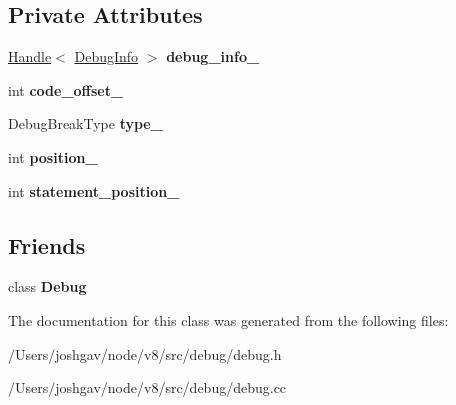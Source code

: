 \subsection*{Private Attributes}
\begin{DoxyCompactItemize}
\item 
\hyperlink{classv8_1_1internal_1_1_handle}{Handle}$<$ \hyperlink{classv8_1_1internal_1_1_debug_info}{Debug\+Info} $>$ {\bfseries debug\+\_\+info\+\_\+}\hypertarget{classv8_1_1internal_1_1_break_location_aee8d3109c7211877acd933a957ca2c6e}{}\label{classv8_1_1internal_1_1_break_location_aee8d3109c7211877acd933a957ca2c6e}

\item 
int {\bfseries code\+\_\+offset\+\_\+}\hypertarget{classv8_1_1internal_1_1_break_location_aa100c7e13bffa6d722c57490717fc018}{}\label{classv8_1_1internal_1_1_break_location_aa100c7e13bffa6d722c57490717fc018}

\item 
Debug\+Break\+Type {\bfseries type\+\_\+}\hypertarget{classv8_1_1internal_1_1_break_location_a99fbc8041af4932997f589308368e35c}{}\label{classv8_1_1internal_1_1_break_location_a99fbc8041af4932997f589308368e35c}

\item 
int {\bfseries position\+\_\+}\hypertarget{classv8_1_1internal_1_1_break_location_a6d3ba8e41e0cc75ffd7a7b249b319c07}{}\label{classv8_1_1internal_1_1_break_location_a6d3ba8e41e0cc75ffd7a7b249b319c07}

\item 
int {\bfseries statement\+\_\+position\+\_\+}\hypertarget{classv8_1_1internal_1_1_break_location_abc0ed4db365a1374bf76bceba5bb8a11}{}\label{classv8_1_1internal_1_1_break_location_abc0ed4db365a1374bf76bceba5bb8a11}

\end{DoxyCompactItemize}
\subsection*{Friends}
\begin{DoxyCompactItemize}
\item 
class {\bfseries Debug}\hypertarget{classv8_1_1internal_1_1_break_location_a2bbda38dab973ea67b9b9dfbf7001640}{}\label{classv8_1_1internal_1_1_break_location_a2bbda38dab973ea67b9b9dfbf7001640}

\end{DoxyCompactItemize}


The documentation for this class was generated from the following files\+:\begin{DoxyCompactItemize}
\item 
/\+Users/joshgav/node/v8/src/debug/debug.\+h\item 
/\+Users/joshgav/node/v8/src/debug/debug.\+cc\end{DoxyCompactItemize}
